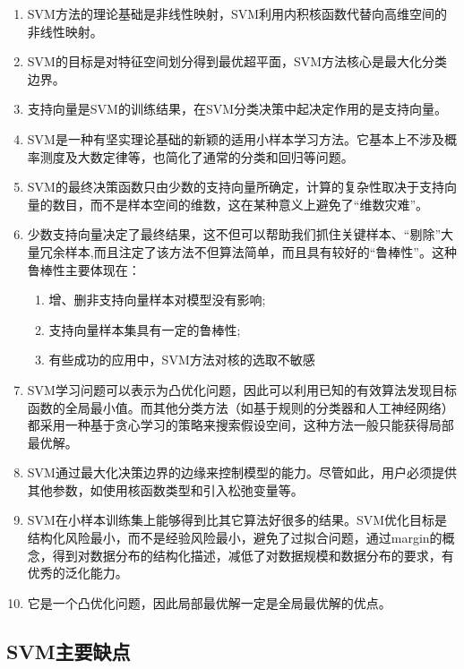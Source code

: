 \begin{enumerate}\itemsep0em 
		\item  SVM方法的理论基础是非线性映射，SVM利用内积核函数代替向高维空间的非线性映射。  
		\item  SVM的目标是对特征空间划分得到最优超平面，SVM方法核心是最大化分类边界。  
		\item  支持向量是SVM的训练结果，在SVM分类决策中起决定作用的是支持向量。  
		\item  SVM是一种有坚实理论基础的新颖的适用小样本学习方法。它基本上不涉及概率测度及大数定律等，也简化了通常的分类和回归等问题。
		\item  SVM的最终决策函数只由少数的支持向量所确定，计算的复杂性取决于支持向量的数目，而不是样本空间的维数，这在某种意义上避免了“维数灾难”。  
		\item  少数支持向量决定了最终结果，这不但可以帮助我们抓住关键样本、“剔除”大量冗余样本,而且注定了该方法不但算法简单，而且具有较好的“鲁棒性”。这种鲁棒性主要体现在：
		\begin{enumerate}\itemsep0em 
				\item 增、删非支持向量样本对模型没有影响;  
				\item 支持向量样本集具有一定的鲁棒性;  
				\item 有些成功的应用中，SVM方法对核的选取不敏感  
		\end{enumerate}

	\item  SVM学习问题可以表示为凸优化问题，因此可以利用已知的有效算法发现目标函数的全局最小值。而其他分类方法（如基于规则的分类器和人工神经网络）都采用一种基于贪心学习的策略来搜索假设空间，这种方法一般只能获得局部最优解。  
	\item  SVM通过最大化决策边界的边缘来控制模型的能力。尽管如此，用户必须提供其他参数，如使用核函数类型和引入松弛变量等。 

	\item  SVM在小样本训练集上能够得到比其它算法好很多的结果。SVM优化目标是结构化风险最小，而不是经验风险最小，避免了过拟合问题，通过margin的概念，得到对数据分布的结构化描述，减低了对数据规模和数据分布的要求，有优秀的泛化能力。  

	\item  它是一个凸优化问题，因此局部最优解一定是全局最优解的优点。  
\end{enumerate}

\subsection{SVM主要缺点}

